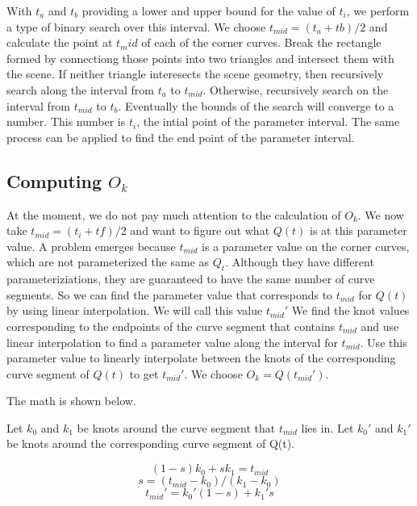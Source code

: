 
With $t_{a}$ and $t_{b}$ providing a lower and upper bound for the value of
$t_{i}$, we perform a type of binary search over this interval.
We choose $t_{mid} = (t_{a} + t{b}) / 2$ and calculate the point at $t_mid$ of
each of the corner curves.
Break the rectangle formed by connectiong those points into two triangles and
intersect them with the scene.
If neither triangle interesects the scene geometry, then recursively search
along the interval from $t_{a}$ to $t_{mid}$.
Otherwise, recursively search on the interval from $t_{mid}$ to $t_{b}$.
Eventually the bounds of the search will converge to a number.
This number is $t_{i}$, the intial point of the parameter interval.
The same process can be applied to find the end point of the parameter
interval.

\subsection{Computing $O_{k}$}
At the moment, we do not pay much attention to the calculation of $O_{k}$.
We now take $t_{mid} = (t_{i} + t{f}) / 2$ and want to figure out what $Q(t)$
is at this parameter value.
A problem emerges because $t_{mid}$ is a parameter value on the corner curves,
which are not parameterized the same as $Q_{t}$.
Although they have different parameteriziations, they are guaranteed to have
the same number of curve segments.
So we can find the parameter value that corresponds to $t_{mid}$ for $Q(t)$ 
by using linear interpolation.
We will call this value $t_{mid}'$
We find the knot values corresponding to the endpoints of the curve segment
that contains $t_{mid}$ and use linear interpolation to find a parameter value
along the interval for $t_{mid}$.
Use this parameter value to linearly interpolate between the knots of the
corresponding curve segment of $Q(t)$ to get $t_{mid}'$.
We choose $O_{k} =  Q(t_{mid}')$.

The math is shown below.

Let $k_{0}$ and $k_{1}$ be knots around the curve segment that $t_{mid}$ lies
in.
Let $k_{0}'$ and $k_{1}'$ be knots around the corresponding curve segment of
Q(t).

\[  (1-s)k_{0} + sk_{1} = t_{mid} \]
\[  s = (t_{mid} - k_{0})/(k_{1} - k_{0}) \]
\[ t_{mid}' = k_{0}'(1-s) + k_{1}'s \]

